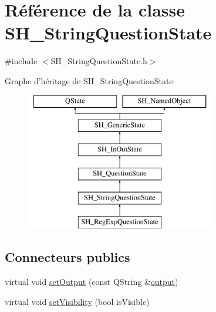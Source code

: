 \hypertarget{classSH__StringQuestionState}{\section{Référence de la classe S\-H\-\_\-\-String\-Question\-State}
\label{classSH__StringQuestionState}
}


{\ttfamily \#include $<$S\-H\-\_\-\-String\-Question\-State.\-h$>$}

Graphe d'héritage de S\-H\-\_\-\-String\-Question\-State\-:\begin{figure}[H]
\begin{center}
\leavevmode
\includegraphics[height=6.000000cm]{classSH__StringQuestionState}
\end{center}
\end{figure}
\subsection*{Connecteurs publics}
\begin{DoxyCompactItemize}
\item 
virtual void \hyperlink{classSH__InOutState_af611c84134e262739cd834797b315c80}{set\-Output} (const Q\-String \&\hyperlink{classSH__InOutState_a17ed7eaf5e3ed5af80a4f9fe65d5bfd9}{output})
\item 
virtual void \hyperlink{classSH__InOutState_a7fdfaa6f600f0ac4a96f238a038ba9ad}{set\-Visibility} (bool is\-Visible)
\end{DoxyCompactItemize}
